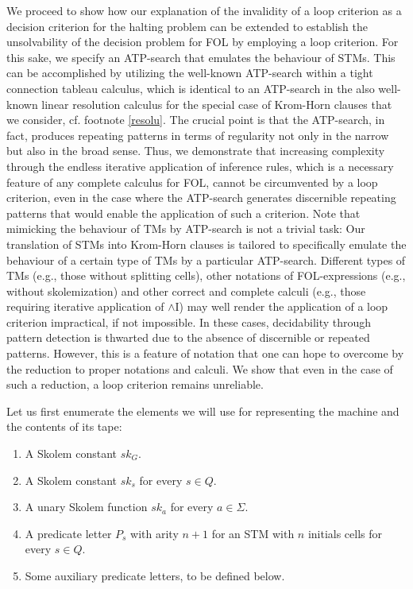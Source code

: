 \documentclass[%
  manuscript=article,   %
  year=2024,
  volume=77,
  doi=00000.000,
]{zfn}
\begin{document}
We proceed to show how our explanation of the invalidity of a loop criterion as a decision criterion for the halting problem can be extended to establish the unsolvability of the decision problem for FOL by employing a loop criterion. For this sake, we specify an ATP-search that emulates the behaviour of STMs. This can be accomplished by utilizing the well-known ATP-search within a tight connection tableau calculus, which is identical to an ATP-search in the also well-known linear resolution calculus for the special case of Krom-Horn clauses that we consider, cf. footnote \ref{resolu}. The crucial point is that the ATP-search, in fact, produces repeating patterns in terms of regularity not only in the narrow but also in the broad sense. Thus, we demonstrate that increasing complexity through the endless iterative application of inference rules, which is a necessary feature of any complete calculus for FOL, cannot be circumvented by a loop criterion, even in the case where the ATP-search generates discernible repeating patterns that would enable the application of such a criterion. Note that mimicking the behaviour of TMs by ATP-search is not a trivial task: Our translation of STMs into Krom-Horn clauses is tailored to specifically emulate the behaviour of a certain type of TMs by a particular ATP-search. Different types of TMs (e.g., those without splitting cells), other notations of FOL-expressions (e.g., without skolemization) and other correct and complete calculi (e.g., those requiring iterative application of $\wedge$I) may well render the application of a loop criterion impractical, if not impossible. In these cases, decidability through pattern detection is thwarted due to the absence of discernible or repeated patterns. However, this is a feature of notation that one can hope to overcome by the reduction to proper notations and calculi. We show that even in the case of such a reduction, a loop criterion remains unreliable.

Let us first enumerate the elements we will use for representing the machine and the contents of its tape:

\begin{enumerate}
\item A Skolem constant $sk_G$.
\item A Skolem constant $sk_s$ for every $s \in Q$. \label{sks}
\item A unary Skolem function $sk_a$ for every $a \in \Sigma$. 
\item A predicate letter $P_s$ with arity $n+1$ for an STM with $n$ initials cells for every $s \in Q$.
\item Some auxiliary predicate letters, to be defined below.
\end{enumerate}
\end{document}
